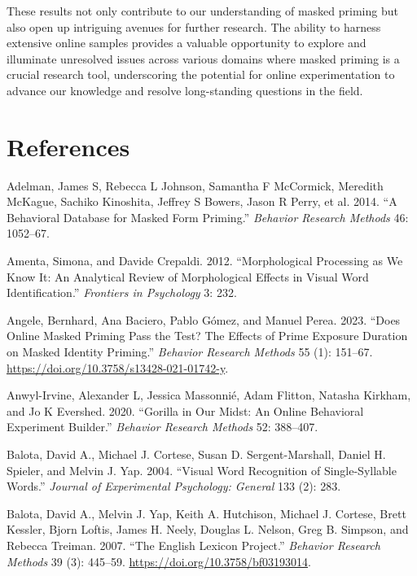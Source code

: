 \documentclass[
]{interact}
\newlength{\cslhangindent}
\newenvironment{CSLReferences}[2] %
 {\begin{list}{}{%
  \setlength{\itemindent}{0pt}
  \setlength{\leftmargin}{0pt}
  \setlength{\parsep}{0pt}
  \ifodd #1
   \setlength{\leftmargin}{\cslhangindent}
   \setlength{\itemindent}{-1\cslhangindent}
  \fi
  \setlength{\itemsep}{#2\baselineskip}}}
 {\end{list}}
\begin{document}
These results not only contribute to our understanding of masked priming
but also open up intriguing avenues for further research. The ability to
harness extensive online samples provides a valuable opportunity to
explore and illuminate unresolved issues across various domains where
masked priming is a crucial research tool, underscoring the potential
for online experimentation to advance our knowledge and resolve
long-standing questions in the field.

\section*{References}\label{references}

\label{refs}
\begin{CSLReferences}{1}{0}
Adelman, James S, Rebecca L Johnson, Samantha F McCormick, Meredith
McKague, Sachiko Kinoshita, Jeffrey S Bowers, Jason R Perry, et al.
2014. {``A Behavioral Database for Masked Form Priming.''}
\emph{Behavior Research Methods} 46: 1052--67.

Amenta, Simona, and Davide Crepaldi. 2012. {``Morphological Processing
as We Know It: An Analytical Review of Morphological Effects in Visual
Word Identification.''} \emph{Frontiers in Psychology} 3: 232.

Angele, Bernhard, Ana Baciero, Pablo Gómez, and Manuel Perea. 2023.
{``Does Online Masked Priming Pass the Test? The Effects of Prime
Exposure Duration on Masked Identity Priming.''} \emph{Behavior Research
Methods} 55 (1): 151--67.
\url{https://doi.org/10.3758/s13428-021-01742-y}.

Anwyl-Irvine, Alexander L, Jessica Massonnié, Adam Flitton, Natasha
Kirkham, and Jo K Evershed. 2020. {``Gorilla in Our Midst: An Online
Behavioral Experiment Builder.''} \emph{Behavior Research Methods} 52:
388--407.

Balota, David A., Michael J. Cortese, Susan D. Sergent-Marshall, Daniel
H. Spieler, and Melvin J. Yap. 2004. {``Visual Word Recognition of
Single-Syllable Words.''} \emph{Journal of Experimental Psychology:
General} 133 (2): 283.

Balota, David A., Melvin J. Yap, Keith A. Hutchison, Michael J. Cortese,
Brett Kessler, Bjorn Loftis, James H. Neely, Douglas L. Nelson, Greg B.
Simpson, and Rebecca Treiman. 2007. {``The English Lexicon Project.''}
\emph{Behavior Research Methods} 39 (3): 445--59.
\url{https://doi.org/10.3758/bf03193014}.


\end{CSLReferences}
\end{document}

